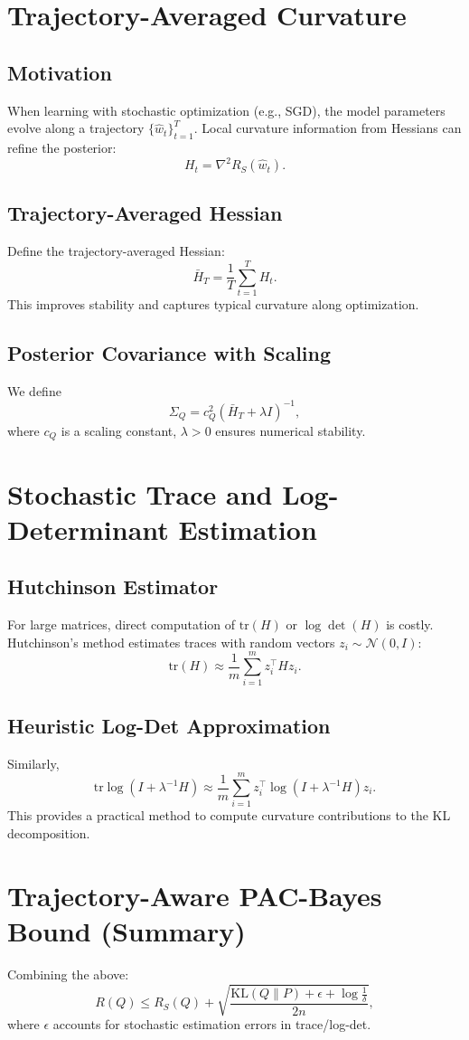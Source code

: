 \documentclass[11pt]{article}
\begin{document}
\section{Trajectory-Averaged Curvature}
\subsection{Motivation}
When learning with stochastic optimization (e.g., SGD), the model parameters evolve along a trajectory $\{\hat w_t\}_{t=1}^T$. 
Local curvature information from Hessians can refine the posterior:
\[
H_t = \nabla^2 R_S(\hat w_t).
\]

\subsection{Trajectory-Averaged Hessian}
Define the trajectory-averaged Hessian:
\[
\bar H_T = \frac{1}{T}\sum_{t=1}^T H_t.
\]
This improves stability and captures typical curvature along optimization.

\subsection{Posterior Covariance with Scaling}
We define
\[
\Sigma_Q = c_Q^2 (\bar H_T + \lambda I)^{-1},
\]
where $c_Q$ is a scaling constant, $\lambda>0$ ensures numerical stability.

\section{Stochastic Trace and Log-Determinant Estimation}
\subsection{Hutchinson Estimator}
For large matrices, direct computation of $\mathrm{tr}(H)$ or $\log\det(H)$ is costly. Hutchinson's method estimates traces with random vectors $z_i\sim \mathcal{N}(0,I)$:
\[
\mathrm{tr}(H) \approx \frac{1}{m}\sum_{i=1}^m z_i^\top H z_i.
\]

\subsection{Heuristic Log-Det Approximation}
Similarly,
\[
\mathrm{tr}\log(I+\lambda^{-1} H) \approx \frac{1}{m}\sum_{i=1}^m z_i^\top \log(I+\lambda^{-1} H) z_i.
\]
This provides a practical method to compute curvature contributions to the KL decomposition.

\section{Trajectory-Aware PAC-Bayes Bound (Summary)}
Combining the above:
\[
R(Q) \le R_S(Q) + \sqrt{\frac{\mathrm{KL}(Q\|P) + \epsilon + \log\frac{1}{\delta}}{2n}},
\]
where $\epsilon$ accounts for stochastic estimation errors in trace/log-det.
\end{document}
